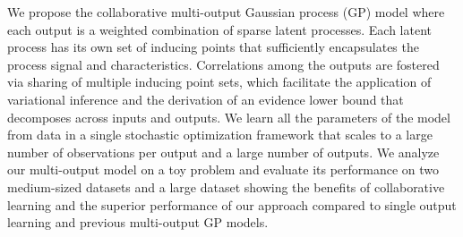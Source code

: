 We propose the collaborative multi-output Gaussian process (GP)  model 
where each output is a weighted combination of sparse latent processes.
 Each latent process has its own set of inducing points that sufficiently encapsulates the process signal and characteristics.
Correlations among the outputs are fostered via sharing of multiple inducing point sets, 
which facilitate  the  application of variational inference and the derivation of 
an evidence lower bound  that decomposes across inputs and outputs. 
We learn all the parameters of the model from data in a  single stochastic optimization framework
that scales to a large number of observations per output and a large number of outputs.
%
We analyze our multi-output model on a toy problem  and evaluate its performance on 
two medium-sized datasets and a large dataset showing the benefits of collaborative learning 
and the superior performance of our approach compared to single output learning and previous 
multi-output GP models.

